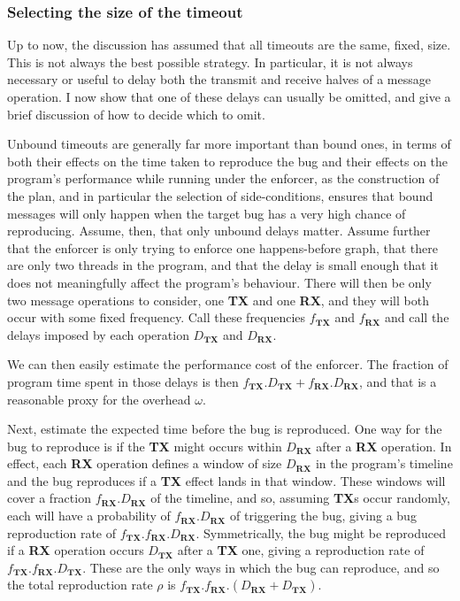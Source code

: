 \subsubsection{Selecting the size of the timeout}
\label{sect:using:timeout_balancing}

Up to now, the discussion has assumed that all timeouts are the same,
fixed, size.  This is not always the best possible strategy.  In
particular, it is not always necessary or useful to delay both the
transmit and receive halves of a message operation.  I now show that
one of these delays can usually be omitted, and give a brief
discussion of how to decide which to omit.

Unbound timeouts are generally far more important than bound ones, in
terms of both their effects on the time taken to reproduce the bug and
their effects on the program's performance while running under the
enforcer, as the construction of the plan, and in particular the
selection of side-conditions, ensures that bound messages will only
happen when the target bug has a very high chance of reproducing.
Assume, then, that only unbound delays matter.  Assume further that
the enforcer is only trying to enforce one happens-before graph, that
there are only two threads in the program, and that the delay is small
enough that it does not meaningfully affect the program's behaviour.
There will then be only two message operations to consider, one
\textbf{TX} and one \textbf{RX}, and they will both occur with some
fixed frequency.  Call these frequencies $f_{\mathbf{TX}}$ and
$f_{\mathbf{RX}}$ and call the delays imposed by each operation
$D_{\mathbf{TX}}$ and $D_{\mathbf{RX}}$.

We can then easily estimate the performance cost of the enforcer.  The
fraction of program time spent in those delays is then
$f_{\mathbf{TX}}.D_{\mathbf{TX}} + f_{\mathbf{RX}}.D_{\mathbf{RX}}$,
and that is a reasonable proxy for the overhead $\omega$.

Next, estimate the expected time before the bug is reproduced.  One
way for the bug to reproduce is if the \textbf{TX} might occurs within
$D_{\mathbf{RX}}$ after a \textbf{RX} operation.  In effect, each
\textbf{RX} operation defines a window of size $D_{\mathbf{RX}}$ in
the program's timeline and the bug reproduces if a \textbf{TX} effect
lands in that window.  These windows will cover a fraction
$f_{\mathbf{RX}}.D_{\mathbf{RX}}$ of the timeline, and so, assuming
\textbf{TX}s occur randomly, each will have a probability of
$f_{\mathbf{RX}}.D_{\mathbf{RX}}$ of triggering the bug, giving a bug
reproduction rate of
$f_{\mathbf{TX}}.f_{\mathbf{RX}}.D_{\mathbf{RX}}$.  Symmetrically, the
bug might be reproduced if a \textbf{RX} operation occurs
$D_{\mathbf{TX}}$ after a \textbf{TX} one, giving a reproduction rate
of $f_{\mathbf{TX}}.f_{\mathbf{RX}}.D_{\mathbf{TX}}$.  These are the
only ways in which the bug can reproduce, and so the total
reproduction rate $\rho$ is
$f_{\mathbf{TX}}.f_{\mathbf{RX}}.(D_{\mathbf{RX}} + D_{\mathbf{TX}})$.

